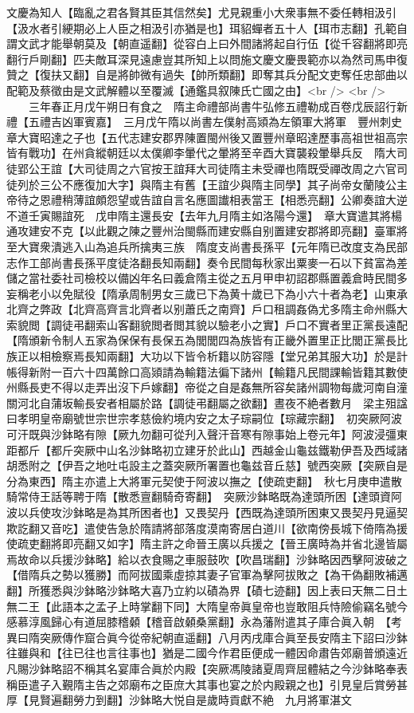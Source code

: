 文慶為知人【臨亂之君各賢其臣其信然矣】尤見親重小大衆事無不委任轉相汲引【汲水者引綆期必上人臣之相汲引亦猶是也】珥貂蟬者五十人【珥市志翻】孔範自謂文武才能舉朝莫及【朝直遥翻】從容白上曰外間諸將起自行伍【從千容翻將即亮翻行戶剛翻】匹夫敵耳深見遠慮豈其所知上以問施文慶文慶畏範亦以為然司馬申復贊之【復扶又翻】自是將帥微有過失【帥所類翻】即奪其兵分配文吏奪任忠部曲以配範及蔡徵由是文武解體以至覆滅【通鑑具叙陳氏亡國之由】<br />
<br />
　　三年春正月戊午朔日有食之　隋主命禮部尚書牛弘修五禮勒成百卷戊辰詔行新禮【五禮吉凶軍賓嘉】　三月戊午隋以尚書左僕射高熲為左領軍大將軍　豐州刺史章大寶昭達之子也【五代志建安郡界陳置閩州後又置豐州章昭達歷事高祖世祖高宗皆有戰功】在州貪縱朝廷以太僕卿李暈代之暈將至辛酉大寶襲殺暈舉兵反　隋大司徒郢公王誼【大司徒周之六官按王誼拜大司徒隋主未受禪也隋既受禪改周之六官司徒列於三公不應復加大字】與隋主有舊【王誼少與隋主同學】其子尚帝女蘭陵公主帝待之恩禮稍薄誼頗怨望或告誼自言名應圖䜟相表當王【相悉亮翻】公卿奏誼大逆不道壬寅賜誼死　戊申隋主還長安【去年九月隋主如洛陽今還】　章大寶遣其將楊通攻建安不克【以此觀之陳之豐州治閩縣而建安縣自别置建安郡將即亮翻】臺軍將至大寶衆潰逃入山為追兵所擒夷三族　隋度支尚書長孫平【元年隋已改度支為民部志作工部尚書長孫平度徒洛翻長知兩翻】奏令民間每秋家出粟麥一石以下貧富為差儲之當社委社司檢校以備凶年名曰義倉隋主從之五月甲申初詔郡縣置義倉時民間多妄稱老小以免賦役【隋承周制男女三歲已下為黄十歲已下為小六十者為老】山東承北齊之弊政【北齊高齊言北齊者以别蕭氏之南齊】戶口租調姦偽尤多隋主命州縣大索貌閲【調徒弔翻索山客翻貌閲者閲其貌以驗老小之實】戶口不實者里正黨長遠配【隋頒新令制人五家為保保有長保五為閭閭四為族皆有正畿外置里正比閭正黨長比族正以相檢察焉長知兩翻】大功以下皆令析籍以防容隱【堂兄弟其服大功】於是計帳得新附一百六十四萬餘口高熲請為輸籍法徧下諸州【輸籍凡民間課輸皆籍其數使州縣長吏不得以走弄出沒下戶嫁翻】帝從之自是姦無所容矣諸州調物每歲河南自潼關河北自蒲坂輸長安者相屬於路【調徒弔翻屬之欲翻】晝夜不絶者數月　梁主殂諡曰孝明皇帝廟號世宗世宗孝慈儉約境内安之太子琮嗣位【琮藏宗翻】　初突厥阿波可汗既與沙鉢略有隙【厥九勿翻可從刋入聲汗音寒有隙事始上卷元年】阿波浸彊東距都斤【都斤突厥中山名沙鉢略初立建牙於此山】西越金山龜兹鐵勒伊吾及西域諸胡悉附之【伊吾之地吐屯設主之蓋突厥所署置也龜兹音丘慈】號西突厥【突厥自是分為東西】隋主亦遣上大將軍元契使于阿波以撫之【使疏吏翻】　秋七月庚申遣散騎常侍王話等聘于隋【散悉亶翻騎奇寄翻】　突厥沙鉢略既為達頭所困【達頭資阿波以兵使攻沙鉢略是為其所困者也】又畏契丹【西既為達頭所困東又畏契丹見逼契欺訖翻又音吃】遣使告急於隋請將部落度漠南寄居白道川【欲南傍長城下倚隋為援使疏吏翻將即亮翻又如字】隋主許之命晉王廣以兵援之【晉王廣時為并省北邊皆屬焉故命以兵援沙鉢略】給以衣食賜之車服鼓吹【吹昌瑞翻】沙鉢略因西擊阿波破之【借隋兵之勢以獲勝】而阿拔國乘虛掠其妻子官軍為擊阿拔敗之【為干偽翻敗補邁翻】所獲悉與沙鉢略沙鉢略大喜乃立約以磧為界【磧七迹翻】因上表曰天無二日土無二王【此語本之孟子上時掌翻下同】大隋皇帝眞皇帝也豈敢阻兵恃險偷竊名號今感慕淳風歸心有道屈膝稽顙【稽音啟顙桑黨翻】永為藩附遣其子庫合眞入朝　【考異曰隋突厥傳作窟合眞今從帝紀朝直遥翻】八月丙戌庫合眞至長安隋主下詔曰沙鉢往雖與和【往已往也言往事也】猶是二國今作君臣便成一體因命肅告郊廟普頒遠近凡賜沙鉢略詔不稱其名宴庫合眞於内殿【突厥馮陵諸夏周齊屈體結之今沙鉢略奉表稱臣遣子入覲隋主告之郊廟布之臣庶大其事也宴之於内殿親之也】引見皇后賞勞甚厚【見賢遍翻勞力到翻】沙鉢略大悦自是歲時貢獻不絶　九月將軍湛文